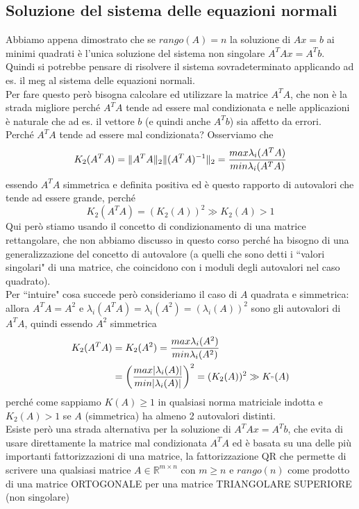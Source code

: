 \subsection{Soluzione del sistema delle equazioni normali}
Abbiamo appena dimostrato che se $rango(A)=n$ la soluzione di $Ax=b$ ai minimi quadrati è l'unica soluzione del sistema non singolare $A^TAx=A^Tb$. \\
Quindi si potrebbe pensare di risolvere il sistema sovradeterminato applicando ad es. il meg al sistema delle equazioni normali. \\
Per fare questo però bisogna calcolare ed utilizzare la matrice $A^TA$, che non è la strada migliore perché $A^TA$ tende ad essere mal condizionata e nelle applicazioni è naturale che ad es. il vettore $b$ (e quindi anche $A^Tb$) sia affetto da errori. \\
Perché $A^TA$ tende ad essere mal condizionata? Osserviamo che 
\begin{equation*}
    K_2(A^TA)=\lVert A^TA\rVert_2\lVert(A^TA)^{-1}\rVert_2 = \frac{max\lambda_i(A^TA)}{min \lambda_i(A^TA)}
\end{equation*}
essendo $A^TA$ simmetrica e definita positiva ed è questo rapporto di autovalori che tende ad essere grande, perché
\begin{equation*}
    K_2(A^TA)=(K_2(A))^2 \gg K_2(A) > 1
\end{equation*}
Qui però stiamo usando il concetto di condizionamento di una matrice rettangolare, che non abbiamo discusso in questo corso perché ha bisogno di una generalizzazione del concetto di autovalore (a quelli che sono detti i ``valori singolari" di una matrice, che coincidono con i moduli degli autovalori nel caso quadrato). \\
Per ``intuire" cosa succede però consideriamo il caso di $A$ quadrata e simmetrica: allora $A^TA=A^2$ e $\lambda_i(A^TA)=\lambda_i(A^2)=(\lambda_i(A))^2$ sono gli autovalori di $A^TA$, quindi essendo $A^2$ simmetrica
\begin{equation*}
    \begin{split}
         K_2(A^TA) & = K_2(A^2)=\frac{max \lambda_i(A^2)}{min \lambda_i(A^2)} \\
         & = \biggl(\frac{max |\lambda_i(A)|}{min |\lambda_i(A)|} \biggr)^2 = (K_2(A))^2 \gg K_"(A)
    \end{split}
\end{equation*}
perché come sappiamo $K(A) \geq 1$ in qualsiasi norma matriciale indotta e $K_2(A) > 1$ se $A$ (simmetrica) ha almeno 2 autovalori distinti. \\
Esiste però una strada alternativa per la soluzione di $A^TAx=A^Tb$, che evita di usare direttamente la matrice mal condizionata $A^TA$ ed è basata su una delle più importanti fattorizzazioni di una matrice, la fattorizzazione QR che permette di scrivere una qualsiasi matrice $A\in \mathbb{R}^{m \times n}$ con $m\geq n$ e $rango(n)$ come prodotto di una matrice ORTOGONALE per una matrice TRIANGOLARE SUPERIORE (non singolare)
